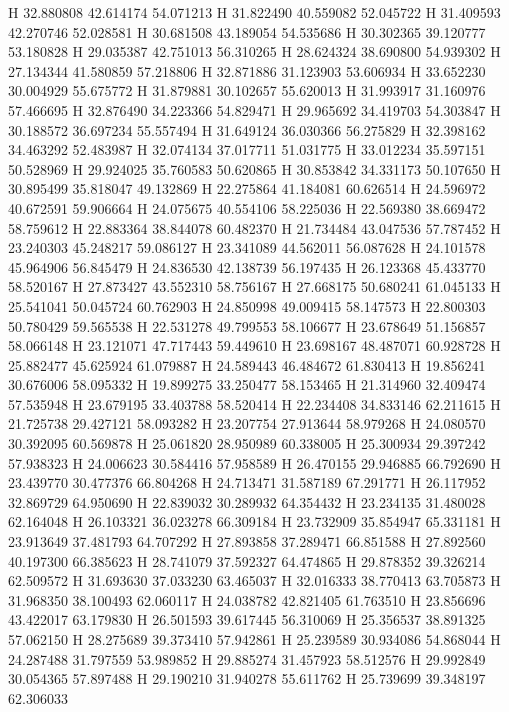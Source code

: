 \documentclass{article}
\begin{document}
H 32.880808 42.614174 54.071213
H 31.822490 40.559082 52.045722
H 31.409593 42.270746 52.028581
H 30.681508 43.189054 54.535686
H 30.302365 39.120777 53.180828
H 29.035387 42.751013 56.310265
H 28.624324 38.690800 54.939302
H 27.134344 41.580859 57.218806
H 32.871886 31.123903 53.606934
H 33.652230 30.004929 55.675772
H 31.879881 30.102657 55.620013
H 31.993917 31.160976 57.466695
H 32.876490 34.223366 54.829471
H 29.965692 34.419703 54.303847
H 30.188572 36.697234 55.557494
H 31.649124 36.030366 56.275829
H 32.398162 34.463292 52.483987
H 32.074134 37.017711 51.031775
H 33.012234 35.597151 50.528969
H 29.924025 35.760583 50.620865
H 30.853842 34.331173 50.107650
H 30.895499 35.818047 49.132869
H 22.275864 41.184081 60.626514
H 24.596972 40.672591 59.906664
H 24.075675 40.554106 58.225036
H 22.569380 38.669472 58.759612
H 22.883364 38.844078 60.482370
H 21.734484 43.047536 57.787452
H 23.240303 45.248217 59.086127
H 23.341089 44.562011 56.087628
H 24.101578 45.964906 56.845479
H 24.836530 42.138739 56.197435
H 26.123368 45.433770 58.520167
H 27.873427 43.552310 58.756167
H 27.668175 50.680241 61.045133
H 25.541041 50.045724 60.762903
H 24.850998 49.009415 58.147573
H 22.800303 50.780429 59.565538
H 22.531278 49.799553 58.106677
H 23.678649 51.156857 58.066148
H 23.121071 47.717443 59.449610
H 23.698167 48.487071 60.928728
H 25.882477 45.625924 61.079887
H 24.589443 46.484672 61.830413
H 19.856241 30.676006 58.095332
H 19.899275 33.250477 58.153465
H 21.314960 32.409474 57.535948
H 23.679195 33.403788 58.520414
H 22.234408 34.833146 62.211615
H 21.725738 29.427121 58.093282
H 23.207754 27.913644 58.979268
H 24.080570 30.392095 60.569878
H 25.061820 28.950989 60.338005
H 25.300934 29.397242 57.938323
H 24.006623 30.584416 57.958589
H 26.470155 29.946885 66.792690
H 23.439770 30.477376 66.804268
H 24.713471 31.587189 67.291771
H 26.117952 32.869729 64.950690
H 22.839032 30.289932 64.354432
H 23.234135 31.480028 62.164048
H 26.103321 36.023278 66.309184
H 23.732909 35.854947 65.331181
H 23.913649 37.481793 64.707292
H 27.893858 37.289471 66.851588
H 27.892560 40.197300 66.385623
H 28.741079 37.592327 64.474865
H 29.878352 39.326214 62.509572
H 31.693630 37.033230 63.465037
H 32.016333 38.770413 63.705873
H 31.968350 38.100493 62.060117
H 24.038782 42.821405 61.763510
H 23.856696 43.422017 63.179830
H 26.501593 39.617445 56.310069
H 25.356537 38.891325 57.062150
H 28.275689 39.373410 57.942861
H 25.239589 30.934086 54.868044
H 24.287488 31.797559 53.989852
H 29.885274 31.457923 58.512576
H 29.992849 30.054365 57.897488
H 29.190210 31.940278 55.611762
H 25.739699 39.348197 62.306033
\end{document}
